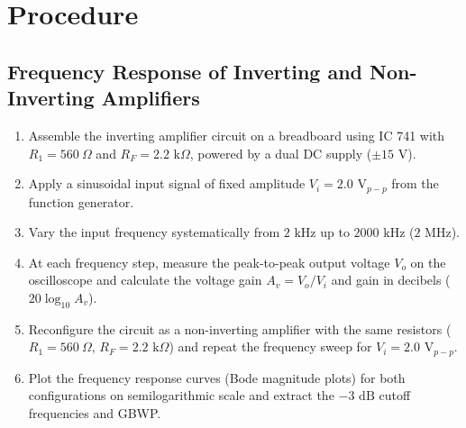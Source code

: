 \documentclass[12pt,a4paper]{article}
\begin{document}
\section{Procedure}

\subsection{Frequency Response of Inverting and Non-Inverting Amplifiers}
\begin{enumerate}
    \item Assemble the inverting amplifier circuit on a breadboard using IC 741 with $R_1 = 560\ \Omega$ and $R_F = 2.2\text{ k}\Omega$, powered by a dual DC supply ($\pm 15\text{ V}$).
    \item Apply a sinusoidal input signal of fixed amplitude $V_i = 2.0\text{ V}_{p-p}$ from the function generator.
    \item Vary the input frequency systematically from $2\text{ kHz}$ up to $2000\text{ kHz}$ ($2\text{ MHz}$).
    \item At each frequency step, measure the peak-to-peak output voltage $V_o$ on the oscilloscope and calculate the voltage gain $A_v = V_o / V_i$ and gain in decibels ($20 \log_{10} A_v$).
    \item Reconfigure the circuit as a non-inverting amplifier with the same resistors ($R_1 = 560\ \Omega$, $R_F = 2.2\text{ k}\Omega$) and repeat the frequency sweep for $V_i = 2.0\text{ V}_{p-p}$.
    \item Plot the frequency response curves (Bode magnitude plots) for both configurations on semilogarithmic scale and extract the $-3\text{ dB}$ cutoff frequencies and GBWP.
\end{enumerate}
\end{document}
